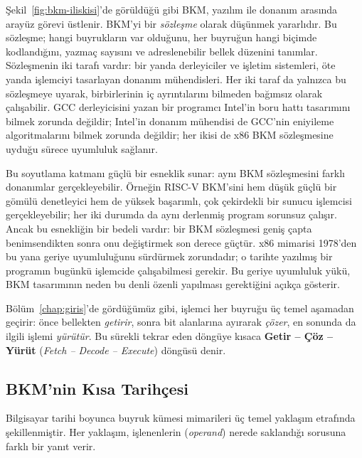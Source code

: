 Şekil~\ref{fig:bkm-iliskisi}'de görüldüğü gibi BKM, yazılım ile donanım arasında arayüz görevi üstlenir. BKM'yi bir \emph{sözleşme} olarak düşünmek yararlıdır. Bu sözleşme; hangi buyrukların var olduğunu, her buyruğun hangi biçimde kodlandığını, yazmaç sayısını ve adreslenebilir bellek düzenini tanımlar. Sözleşmenin iki tarafı vardır: bir yanda derleyiciler ve işletim sistemleri, öte yanda işlemciyi tasarlayan donanım mühendisleri. Her iki taraf da yalnızca bu sözleşmeye uyarak, birbirlerinin iç ayrıntılarını bilmeden bağımsız olarak çalışabilir. GCC derleyicisini yazan bir programcı Intel'in boru hattı tasarımını bilmek zorunda değildir; Intel'in donanım mühendisi de GCC'nin eniyileme algoritmalarını bilmek zorunda değildir; her ikisi de x86 BKM sözleşmesine uyduğu sürece uyumluluk sağlanır.

Bu soyutlama katmanı güçlü bir esneklik sunar: aynı BKM sözleşmesini farklı donanımlar gerçekleyebilir. Örneğin RISC-V BKM'sini hem düşük güçlü bir gömülü denetleyici hem de yüksek başarımlı, çok çekirdekli bir sunucu işlemcisi gerçekleyebilir; her iki durumda da aynı derlenmiş program sorunsuz çalışır. Ancak bu esnekliğin bir bedeli vardır: bir BKM sözleşmesi geniş çapta benimsendikten sonra onu değiştirmek son derece güçtür. x86 mimarisi 1978'den bu yana geriye uyumluluğunu sürdürmek zorundadır; o tarihte yazılmış bir programın bugünkü işlemcide çalışabilmesi gerekir. Bu geriye uyumluluk yükü, BKM tasarımının neden bu denli özenli yapılması gerektiğini açıkça gösterir.

Bölüm~\ref{chap:giris}'de gördüğümüz gibi, işlemci her buyruğu üç temel aşamadan geçirir: önce bellekten \emph{getirir}, sonra bit alanlarına ayırarak \emph{çözer}, en sonunda da ilgili işlemi \emph{yürütür}. Bu sürekli tekrar eden döngüye kısaca \textbf{Getir -- Çöz -- Yürüt} (\emph{Fetch -- Decode -- Execute}) döngüsü denir.


\subsection{BKM'nin Kısa Tarihçesi}
\label{subsec:bkm-tarihce}

Bilgisayar tarihi boyunca buyruk kümesi mimarileri üç temel yaklaşım etrafında şekillenmiştir. Her yaklaşım, işlenenlerin (\emph{operand}) nerede saklandığı sorusuna farklı bir yanıt verir.


